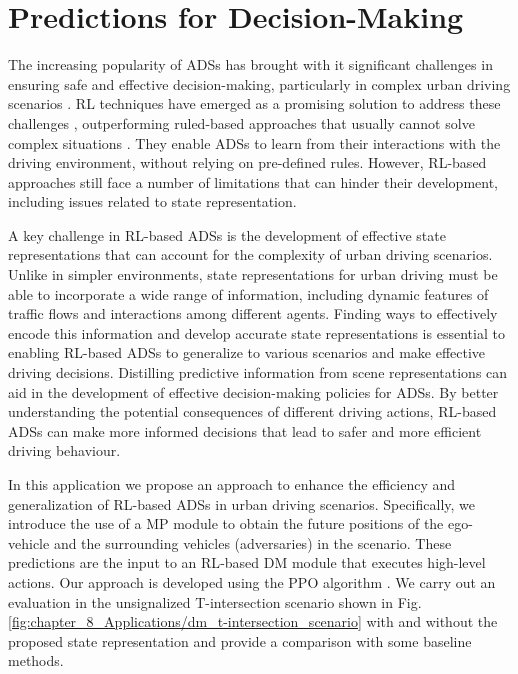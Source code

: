 \section{Predictions for Decision-Making}
\label{sec:8_decision_making}


The increasing popularity of \acp{ADS} has brought with it significant challenges in ensuring safe and effective decision-making, particularly in complex urban driving scenarios \cite{Yurtsever2019}. \ac{RL} techniques have emerged as a promising solution to address these challenges \cite{Ravi2020}, outperforming ruled-based approaches that usually cannot solve complex situations \cite{Zhu2019}. They enable \acp{ADS} to learn from their interactions with the driving environment, without relying on pre-defined rules. However, \ac{RL}-based approaches still face a number of limitations that can hinder their development, including issues related to state representation. %

A key challenge in \ac{RL}-based \acp{ADS} is the development of effective state representations that can account for the complexity of urban driving scenarios. Unlike in simpler environments, state representations for urban driving must be able to incorporate a wide range of information, including dynamic features of traffic flows and interactions among different agents. Finding ways to effectively encode this information and develop accurate state representations is essential to enabling \ac{RL}-based \acp{ADS} to generalize to various scenarios and make effective driving decisions. Distilling predictive information from scene representations can aid in the development of effective decision-making policies for \acp{ADS}. By better understanding the potential consequences of different driving actions, \ac{RL}-based \acp{ADS} can make more informed decisions that lead to safer and more efficient driving behaviour.

In this application we propose an approach to enhance the efficiency and generalization of \ac{RL}-based \acp{ADS} in urban driving scenarios. Specifically, we introduce the use of a \ac{MP} module to obtain the future positions of the ego-vehicle and the surrounding vehicles (adversaries) in the scenario. These predictions are the input to an \ac{RL}-based \ac{DM} module that executes high-level actions. Our approach is developed using the \ac{PPO} algorithm  \cite{Schulman2017}.  We carry out an evaluation in the unsignalized T-intersection scenario shown in Fig. \ref{fig:chapter_8_Applications/dm_t-intersection_scenario} with and without the proposed state representation and provide a comparison with some baseline methods.

